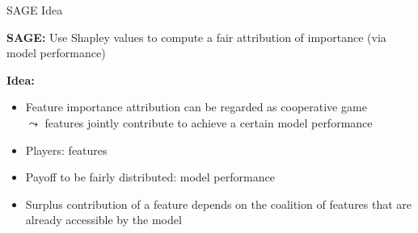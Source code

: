 \documentclass[11pt,compress,t,notes=noshow, aspectratio=169, xcolor=table]{beamer}
\begin{document}
\begin{frame}{SAGE Idea 
}

\textbf{SAGE:} %
Use Shapley values to compute a fair attribution of importance (via model performance)\\
\lz

\textbf{Idea:} 
\begin{itemize}
    \item Feature importance attribution can be regarded as cooperative game \\
    $\leadsto$ features jointly contribute to achieve a certain model performance
    \item Players: features
    \item Payoff to be fairly distributed: model performance
    \item Surplus contribution of a feature depends on the coalition of features that are already accessible by the model
\end{itemize}


\lz

  
\end{frame}
\end{document}
